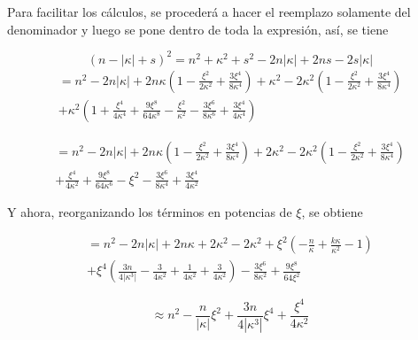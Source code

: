 \documentclass[a4paper, 12pt]{article} %
\begin{document}
Para facilitar los c\'alculos, se proceder\'a a hacer el reemplazo solamente del denominador y luego se pone dentro de toda la expresi\'on, as\'i, se tiene

\[
(n-|\kappa| + s)^2 = n^2 + \kappa^2 + s^2 -2n|\kappa| +2ns -2s|\kappa| 
\]
\[
\begin{split}
= n^2-2n|\kappa|+2n\kappa \left( 1-\frac{\xi^2}{2\kappa^2} +\frac{3\xi^4}{8\kappa^4} \right) +\kappa^2 -2\kappa^2 \left( 1-\frac{\xi^2}{2\kappa^2} +\frac{3\xi^4}{8\kappa^4} \right) \\
+ \kappa^2 \left(  1+\frac{\xi^4}{4\kappa^4} +\frac{9\xi^8}{64\kappa^8} -\frac{\xi^2}{\kappa^2} -\frac{3\xi^6}{8\kappa^6} + \frac{3\xi^4}{4\kappa^4} \right)
\end{split}
\]

\[
\begin{split}
=n^2-2n|\kappa| +2n\kappa \left( 1-\frac{\xi^2}{2\kappa^2} +\frac{3\xi^4}{8\kappa^4} \right) +2\kappa^2 -2\kappa^2 \left( 1-\frac{\xi^2}{2\kappa^2} +\frac{3\xi^4}{8\kappa^4} \right) \\
+\frac{\xi^4}{4\kappa^2} +\frac{9\xi^8}{64\kappa^6} -\xi^2 -\frac{3\xi^6}{8\kappa^4} + \frac{3\xi^4}{4\kappa^2}
\end{split}
\]

Y ahora, reorganizando los t\'erminos en potencias de  $\xi$, se obtiene

\[
\begin{split}
=n^2 -2n|\kappa| + 2n\kappa + 2\kappa^2 - 2\kappa^2 + \xi^2 \left(  -\frac{n}{\kappa} + \frac{k\kappa}{\kappa^2} -1 \right) \\
+ \xi^4 \left(  \frac{3n}{4|\kappa^3|} -\frac{3}{4\kappa^2} +\frac{1}{4\kappa^2} + \frac{3}{4\kappa^2}  \right)  -\frac{3\xi^6}{8\kappa^2} + \frac{9\xi^8}{64\xi^2}
\end{split}
\]

\[
\approx n^2 - \frac{n}{|\kappa|}\xi^2 +\frac{3n}{4|\kappa^3|}\xi^4 +\frac{\xi^4}{4\kappa^2}
\]








\end{document}
